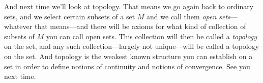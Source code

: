And next time we'll look at topology. That means we go again back to ordinary sets, and we select certain subsets of a set $M$ and we call them \emph{open sets}---whatever that means---and there will be axioms for what kind of collection of subsets of $M$ you can call open sets. This collection will then be called a \emph{topology} on the set, and any such collection---largely not unique---will be called a topology on the set. And topology is the weakest known structure you can establish on a set in order to define notions of continuity and notions of convergence. See you next time.
